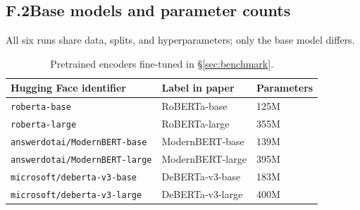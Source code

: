 \subsection*{F.2\quad Base models and parameter counts}
All six runs share data, splits, and hyperparameters; only the base model differs.
\begin{table}[ht]
\centering
\caption{Pretrained encoders fine-tuned in \S\ref{sec:benchmark}.}
\label{tab:training-models}
\small
\begin{tabular}{lll}
\toprule
Hugging Face identifier & Label in paper & Parameters \\
\midrule
\texttt{roberta-base} & RoBERTa-base & 125M \\
\texttt{roberta-large} & RoBERTa-large & 355M \\
\texttt{answerdotai/ModernBERT-base} & ModernBERT-base & 139M \\
\texttt{answerdotai/ModernBERT-large} & ModernBERT-large & 395M \\
\texttt{microsoft/deberta-v3-base} & DeBERTa-v3-base & 183M \\
\texttt{microsoft/deberta-v3-large} & DeBERTa-v3-large & 400M \\
\bottomrule
\end{tabular}
\end{table}

